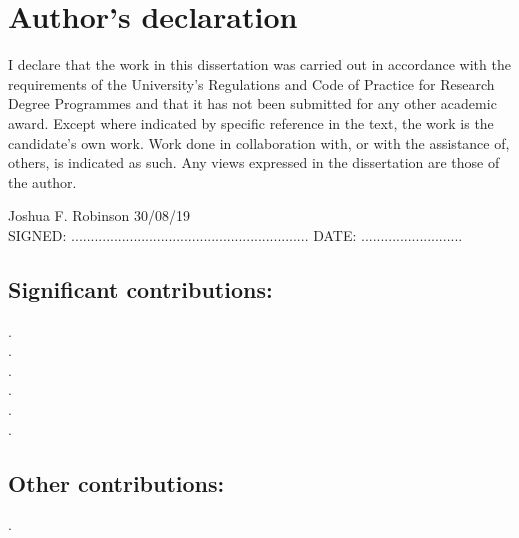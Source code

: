 \chapter*{Author's declaration}

I declare that the work in this dissertation was carried out in accordance with the requirements of the University's Regulations and Code of Practice for Research Degree Programmes and that it has not been submitted for any other academic award.
Except where indicated by specific reference in the text, the work is the candidate's own work.
Work done in collaboration with, or with the assistance of, others, is indicated as such. Any views expressed in the dissertation are those of the author.

\vspace{1cm}
\vspace{-3pt}

\hspace{2.5cm} Joshua F. Robinson \hspace{4.25cm} 30/08/19 \vspace{-\baselineskip} \vspace{3pt} \\
SIGNED: .............................................................
\qquad
DATE: ..........................

\vspace{1cm}

\section*{Significant contributions:}

\cite{RobinsonPRL2019}\; . \\
\cite{GregsonJPCB2019}\; . \\
\cite{RobinsonPRE2019}\; . \\
\cite{RobinsonResummation2019}\; . \\
\cite{RobinsonTBD2019}\; . \\
\cite{GregsonTBD2019}\; . \\

\section*{Other contributions:}

\cite{RoyallJPCM2018}\; .
